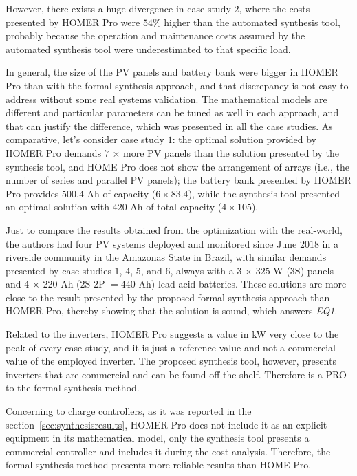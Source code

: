However, there exists a huge divergence in case study $2$, 
where the costs presented by HOMER Pro were $54$\% higher 
than the automated synthesis tool, probably because the 
operation and maintenance costs assumed by the automated 
synthesis tool were underestimated to that specific load. 

In general, the size of the PV panels and battery bank were 
bigger in HOMER Pro than with the formal synthesis approach, 
and that discrepancy is not easy to address without some real 
systems validation. The mathematical models are different and 
particular parameters can be tuned as well in each approach, 
and that can justify the difference, which was presented in all 
the case studies. As comparative, let's consider case study $1$: 
the optimal solution provided by HOMER Pro demands $7$ $\times$ 
more PV panels than the solution presented by the synthesis tool, 
and HOME Pro does not show the arrangement of arrays 
(i.e., the number of series and parallel PV panels); 
the battery bank presented by HOMER Pro provides $500.4$ Ah 
of capacity ($6 \times 83.4$), while the synthesis tool 
presented an optimal solution with $420$ Ah of total capacity 
($4 \times 105$). 

Just to compare the results obtained from the optimization 
with the real-world, the authors had four PV systems deployed 
and monitored since June $2018$ in a riverside community 
in the Amazonas State in Brazil, with similar demands 
presented by case studies $1$, $4$, $5$, and $6$, 
always with a $3$ $\times$ $325$ W ($3$S) panels and 
$4$ $\times$ $220$ Ah ($2$S-$2$P $= 440$ Ah) 
lead-acid batteries. These solutions are more close 
to the result presented by the proposed formal synthesis 
approach than HOMER Pro, thereby showing that the 
solution is sound, which answers \textit{EQ1}.

Related to the inverters, HOMER Pro suggests a value in 
kW very close to the peak of every case study, and it 
is just a reference value and not a commercial value of 
the employed inverter. The proposed synthesis tool, however, 
presents inverters that are commercial and can be found 
off-the-shelf. Therefore is a PRO to the formal synthesis method.

Concerning to charge controllers, as it was reported in 
the section~\ref{sec:synthesisresults}, HOMER Pro does not include it 
as an explicit equipment in its mathematical model, 
only the synthesis tool presents a commercial controller 
and includes it during the cost analysis. Therefore, 
the formal synthesis method presents more reliable results than
HOME Pro.

